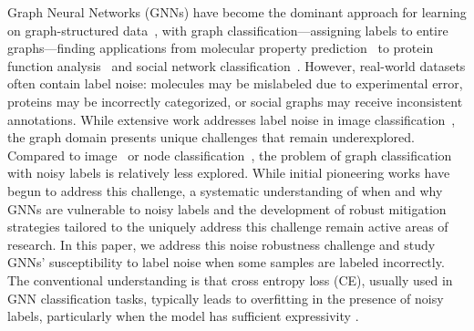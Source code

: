 

%
Graph Neural Networks (GNNs) have become the dominant approach for learning on graph-structured data~\cite{dgcnn, diffpool, hgpsl}, with graph classification---assigning labels to entire graphs---finding applications from molecular property prediction~\cite{NCI} to protein function analysis~\cite{proteins} and social network classification~\cite{Yanardag2015a}. 
%
However, real-world datasets often contain label noise: molecules may be mislabeled due to experimental error, proteins may be incorrectly categorized, or social graphs may receive inconsistent annotations. 
%
While extensive work addresses label noise in image classification~\cite{algan2021image}, the graph domain presents unique challenges that remain underexplored.
%
Compared to image~\cite{algan2021image} or node classification~\cite{nrgnn11}, the problem of graph classification with noisy labels is relatively less explored.
%
While initial pioneering works \cite{nt2019revisiting, omg7} have begun to address this challenge, a systematic understanding of when and why GNNs are vulnerable to noisy labels and the development of robust mitigation strategies tailored to the uniquely address this challenge remain active areas of research.
%
In this paper, we address this noise robustness challenge and study GNNs' susceptibility to label noise when some samples are labeled incorrectly.
%
The conventional understanding is that cross entropy loss (CE), usually used in GNN classification tasks, typically leads to overfitting in the presence of noisy labels, particularly when the model has sufficient expressivity \cite{memorizenoise}.
%

